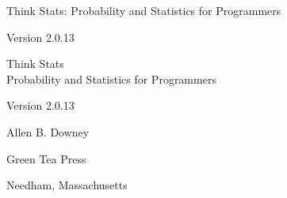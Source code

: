 \documentclass[12pt]{book}
\newcommand{\theversion}{2.0.13}
\begin{document}
\begin{latexonly}

\renewcommand{\blankpage}{\thispagestyle{empty} \quad \newpage}



\thispagestyle{empty}

\begin{flushright}
\vspace*{2.0in}

\begin{spacing}{3}
{\huge Think Stats: Probability and Statistics for Programmers}\\
{\Large }
\end{spacing}

\vspace{0.25in}

Version \theversion

\vfill

\end{flushright}


\blankpage
\blankpage

\pagebreak
\thispagestyle{empty}

\begin{flushright}
\vspace*{2.0in}

\begin{spacing}{3}
{\huge Think Stats}\\
{\Large Probability and Statistics for Programmers}
\end{spacing}

\vspace{0.25in}

Version \theversion

\vspace{1in}


{\Large
Allen B. Downey\\
}


\vspace{0.5in}

{\Large Green Tea Press}

{\small Needham, Massachusetts}


\end{flushright}
\end{latexonly}
\end{document}
